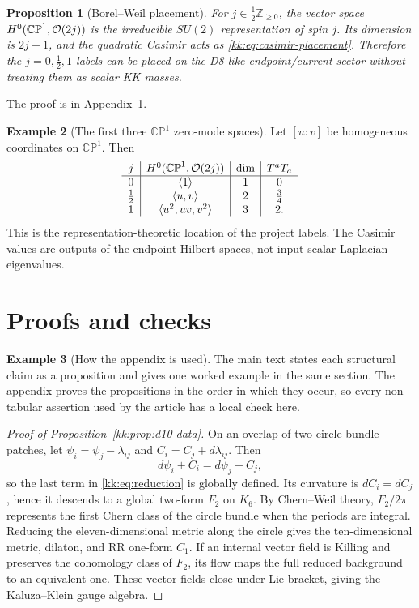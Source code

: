 \documentclass[11pt]{article}
\newcommand{\CP}{\mathbb{CP}}
\newcommand{\ZZ}{\mathbb{Z}}
\theoremstyle{plain}
\newtheorem{proposition}{Proposition}[section]
\theoremstyle{definition}
\newtheorem{example}[proposition]{Example}
\begin{document}
\begin{proposition}[Borel--Weil placement]
\label{kk:prop:borel-weil}
For \(j\in\frac12\ZZ_{\ge0}\), the vector space
\(H^0(\CP^1,{\cal O}(2j))\) is the irreducible \(SU(2)\) representation of
spin \(j\).  Its dimension is \(2j+1\), and the quadratic Casimir acts as
\eqref{kk:eq:casimir-placement}.  Therefore the \(j=0,\tfrac12,1\) labels can be
placed on the D8-like endpoint/current sector without treating them as scalar
KK masses.
\end{proposition}
The proof is in Appendix~\ref{kk:app:proofs}.

\begin{example}[The first three \(\CP^1\) zero-mode spaces]
\label{kk:ex:first-three-vj}
Let \([u:v]\) be homogeneous coordinates on \(\CP^1\).  Then
\[
\begin{array}{c|c|c|c}
j & H^0(\CP^1,{\cal O}(2j)) & \dim & T^aT_a\\
\hline
0 & \langle 1\rangle & 1 & 0\\
\tfrac12 & \langle u,v\rangle & 2 & \tfrac34\\
1 & \langle u^2,uv,v^2\rangle & 3 & 2 .
\end{array}
\]
This is the representation-theoretic location of the project labels.  The
Casimir values are outputs of the endpoint Hilbert spaces, not input scalar
Laplacian eigenvalues.
\end{example}

\appendix
\section{Proofs and checks}
\label{kk:app:proofs}

\begin{example}[How the appendix is used]
The main text states each structural claim as a proposition and gives one
worked example in the same section.  The appendix proves the propositions in
the order in which they occur, so every non-tabular assertion used by the
article has a local check here.
\end{example}

\begin{proof}[Proof of Proposition~\ref{kk:prop:d10-data}]
On an overlap of two circle-bundle patches, let
\(\psi_i=\psi_j-\lambda_{ij}\) and \(C_i=C_j+d\lambda_{ij}\).  Then
\[
  d\psi_i+C_i=d\psi_j+C_j ,
\]
so the last term in \eqref{kk:eq:reduction} is globally defined.  Its curvature is
\(dC_i=dC_j\), hence it descends to a global two-form \(F_2\) on \(K_6\).  By
Chern--Weil theory, \(F_2/2\pi\) represents the first Chern class of the
circle bundle when the periods are integral.  Reducing the eleven-dimensional
metric along the circle gives the ten-dimensional metric, dilaton, and RR
one-form \(C_1\).  If an internal vector field is Killing and preserves the
cohomology class of \(F_2\), its flow maps the full reduced background to an
equivalent one.  These vector fields close under Lie bracket, giving the
Kaluza--Klein gauge algebra.
\end{proof}
\end{document}
